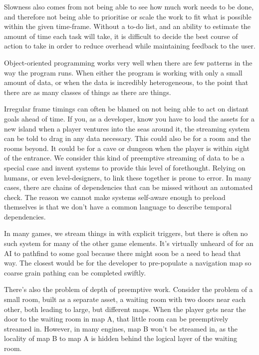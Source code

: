 \documentclass[a4paper,12pt]{article}
\begin{document}
Slowness also comes from not being able to see how much work needs to be done, and therefore not being able to prioritise or scale the work to fit what is possible within the given time-frame.
Without a to-do list, and an ability to estimate the amount of time each task will take, it is difficult to decide the best course of action to take in order to reduce overhead while maintaining feedback to the user.

Object-oriented programming works very well when there are few patterns in the way the program runs.
When either the program is working with only a small amount of data, or when the data is incredibly heterogeneous, to the point that there are as many classes of things as there are things.

Irregular frame timings can often be blamed on not being able to act on distant goals ahead of time.
If you, as a developer, know you have to load the assets for a new island when a player ventures into the seas around it, the streaming system can be told to drag in any data necessary.
This could also be for a room and the rooms beyond.
It could be for a cave or dungeon when the player is within sight of the entrance.
We consider this kind of preemptive streaming of data to be a special case and invent systems to provide this level of forethought.
Relying on humans, or even level-designers, to link these together is prone to error.
In many cases, there are chains of dependencies that can be missed without an automated check.
The reason we cannot make systems self-aware enough to preload themselves is that we don't have a common language to describe temporal dependencies.

In many games, we stream things in with explicit triggers, but there is often no such system for many of the other game elements.
It's virtually unheard of for an AI to pathfind to some goal because there might soon be a need to head that way.
The closest would be for the developer to pre-populate a navigation map so coarse grain pathing can be completed swiftly.

There's also the problem of depth of preemptive work.
Consider the problem of a small room, built as a separate asset, a waiting room with two doors near each other, both leading to large, but different maps.
When the player gets near the door to the waiting room in map A, that little room can be preemptively streamed in.
However, in many engines, map B won't be streamed in, as the locality of map B to map A is hidden behind the logical layer of the waiting room.
\end{document}
